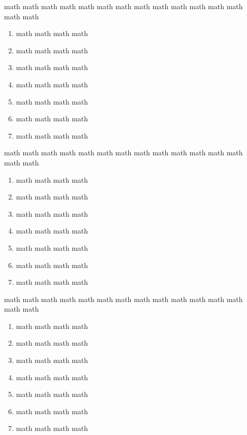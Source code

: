 \documentclass[12pt,a4paper]{article}
\begin{document}
\newpage
\begin{Exercice}
math math math math math math math math math math math math math math math 
\begin{enumerate}[label=\textbf{\color{col3}\arabic*.}]
 \item math math math math 
 \item math math math math 
 \item math math math math 
 \item math math math math 
 \item math math math math 
 \item math math math math 
 \item math math math math 
\end{enumerate}
\end{Exercice}
\begin{Exercice}
math math math math math math math math math math math math math math math 
\begin{enumerate}[label=\textbf{\color{col3}\arabic*.}]
 \item math math math math 
 \item math math math math 
 \item math math math math 
 \item math math math math 
 \item math math math math 
 \item math math math math 
 \item math math math math 
\end{enumerate}
\end{Exercice}
\begin{Exercice}
math math math math math math math math math math math math math math math 
\begin{enumerate}[label=\textbf{\color{col3}\arabic*.}]
 \item math math math math 
 \item math math math math 
 \item math math math math 
 \item math math math math 
 \item math math math math 
 \item math math math math 
 \item math math math math 
\end{enumerate}
\end{Exercice}
\end{document}
